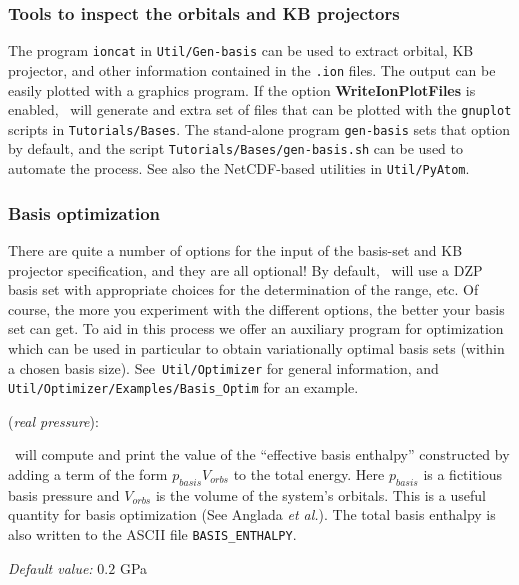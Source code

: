 \subsubsection{Tools to inspect the orbitals and KB projectors}

The program \texttt{ioncat} in \texttt{Util/Gen-basis} can be used to
extract orbital, KB projector, and other information contained in the
\texttt{.ion} files. The output can be easily plotted with a graphics
program.  If the option \textbf{WriteIonPlotFiles} is enabled, \siesta\ 
will generate and extra set of files that can be plotted
with the \texttt{gnuplot} scripts in \texttt{Tutorials/Bases}.
The stand-alone program \texttt{gen-basis} sets that option by default, and
the script \texttt{Tutorials/Bases/gen-basis.sh} can be used to automate
the process. See also the NetCDF-based utilities in \texttt{Util/PyAtom}.

\subsubsection{Basis optimization}

There are quite a number of options for the input of the basis-set and
KB projector specification, and they are all optional! By default,
\siesta\ will use a DZP basis set with appropriate choices for the
determination of the range, etc. Of course, the more you experiment
with the different options, the better your basis set can get. To aid
in this process we offer an auxiliary program for optimization which
can be used in particular to obtain variationally optimal basis sets
(within a chosen basis size). See \texttt{Util/Optimizer}
for general information, and \texttt{Util/Optimizer/Examples/Basis\_Optim}
for an example.

\begin{description}
\itemsep 10pt
\parsep 0pt
\item[\textbf{BasisPressure}] (\textit{real pressure}):

\siesta\ will compute and print the value of the ``effective basis
enthalpy'' constructed by adding a term of the form
$p_{basis}V_{orbs}$ to the total energy. Here $p_{basis}$ is a
fictitious basis pressure and $V_{orbs}$ is the volume of the system's
orbitals. This is a useful quantity for basis optimization (See
Anglada \textit{et al.\/}). The total basis enthalpy is also written to
the ASCII file \texttt{BASIS\_ENTHALPY}.

\textit{Default value:} { $0.2$ GPa}

\end{description}

